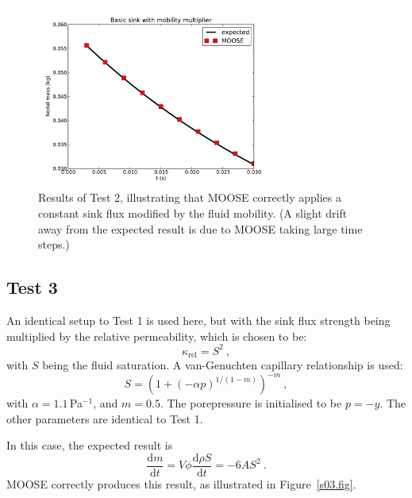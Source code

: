 \documentclass[]{scrreprt}
\def\d{\mathrm{d}}
\begin{document}
\begin{figure}[htb]
\begin{center}
\includegraphics[width=8cm]{s02.pdf}
\caption{Results of Test 2, illustrating that MOOSE correctly applies
  a constant sink flux modified by the fluid mobility.  (A slight
  drift away from the expected result is due to MOOSE taking large
  time steps.)}
\label{s02.fig}
\end{center}
\end{figure}


\subsection{Test 3}

An identical setup to Test 1 is used here, but with the sink flux
strength being multiplied by the relative permeability, which is
chosen to be:
\begin{equation}
\kappa_{\mathrm{rel}} = S^{2} \ ,
\end{equation}
with $S$ being the fluid saturation.  A van-Genuchten capillary
relationship is used:
\begin{equation}
S = \left( 1 + (-\alpha p)^{1/(1-m)} \right)^{-m} \ ,
\end{equation}
with $\alpha = 1.1$\,Pa$^{-1}$, and $m=0.5$.  The porepressure is
initialised to be $p=-y$.  The other parameters are
identical to Test 1.

In this case, the expected result is
\begin{equation}
\frac{\d m}{\d t} = V\phi \frac{\d \rho S}{\d t} = -6 A S^{2} \ .
\end{equation}
MOOSE correctly produces this result, as illustrated in
Figure~\ref{s03.fig}.
\end{document}
